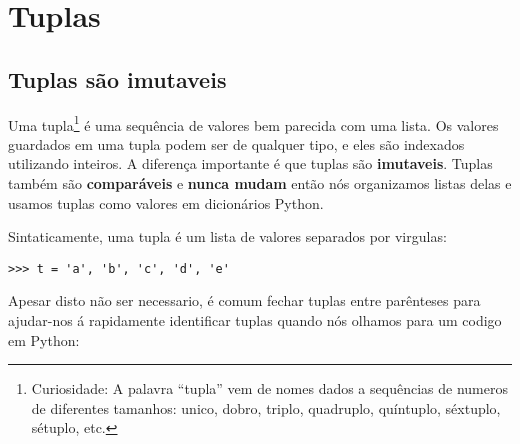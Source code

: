 
\chapter{Tuplas}
\label{tuplechap}

\section{Tuplas são imutaveis}


Uma tupla\footnote{Curiosidade: A palavra ``tupla'' vem de nomes 
dados a sequências de numeros de diferentes tamanhos: unico, dobro,
triplo, quadruplo, quíntuplo, séxtuplo, sétuplo, etc.} é uma sequência
de valores bem parecida com uma lista.
Os valores guardados em uma tupla podem ser de qualquer tipo, e
eles são indexados utilizando inteiros.
A diferença importante é que tuplas são {\bf imutaveis}.
Tuplas também são {\bf comparáveis} e {\bf nunca mudam} então nós
organizamos listas delas e usamos tuplas como valores em dicionários Python.


Sintaticamente, uma tupla é um lista de valores separados por virgulas:

\beforeverb
\begin{verbatim}
>>> t = 'a', 'b', 'c', 'd', 'e'
\end{verbatim}
\afterverb
%
Apesar disto não ser necessario, é comum fechar tuplas entre parênteses
para ajudar-nos á rapidamente identificar tuplas quando nós olhamos
para um codigo em Python:

